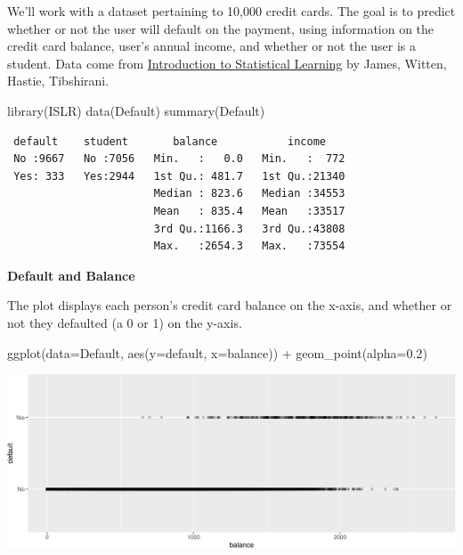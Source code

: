 \documentclass[
  letterpaper,
  DIV=11,
  numbers=noendperiod]{scrreprt}
\newenvironment{Shaded}{\begin{snugshade}}{\end{snugshade}}
\newcommand{\AttributeTok}[1]{\textcolor[rgb]{0.40,0.45,0.13}{#1}}
\newcommand{\FloatTok}[1]{\textcolor[rgb]{0.68,0.00,0.00}{#1}}
\newcommand{\FunctionTok}[1]{\textcolor[rgb]{0.28,0.35,0.67}{#1}}
\newcommand{\NormalTok}[1]{\textcolor[rgb]{0.00,0.23,0.31}{#1}}
\newcommand{\SpecialCharTok}[1]{\textcolor[rgb]{0.37,0.37,0.37}{#1}}
\begin{document}
We'll work with a dataset pertaining to 10,000 credit cards. The goal is
to predict whether or not the user will default on the payment, using
information on the credit card balance, user's annual income, and
whether or not the user is a student. Data come from
\href{http://www-bcf.usc.edu/~gareth/ISL/data.html}{Introduction to
Statistical Learning} by James, Witten, Hastie, Tibshirani.

\begin{Shaded}
\begin{Highlighting}[]
\FunctionTok{library}\NormalTok{(ISLR)}
\FunctionTok{data}\NormalTok{(Default)}
\FunctionTok{summary}\NormalTok{(Default)}
\end{Highlighting}
\end{Shaded}

\begin{verbatim}
 default    student       balance           income     
 No :9667   No :7056   Min.   :   0.0   Min.   :  772  
 Yes: 333   Yes:2944   1st Qu.: 481.7   1st Qu.:21340  
                       Median : 823.6   Median :34553  
                       Mean   : 835.4   Mean   :33517  
                       3rd Qu.:1166.3   3rd Qu.:43808  
                       Max.   :2654.3   Max.   :73554  
\end{verbatim}

\textbf{Default and Balance}

The plot displays each person's credit card balance on the x-axis, and
whether or not they defaulted (a 0 or 1) on the y-axis.

\begin{Shaded}
\begin{Highlighting}[]
\FunctionTok{ggplot}\NormalTok{(}\AttributeTok{data=}\NormalTok{Default, }\FunctionTok{aes}\NormalTok{(}\AttributeTok{y=}\NormalTok{default, }\AttributeTok{x=}\NormalTok{balance)) }\SpecialCharTok{+} \FunctionTok{geom\_point}\NormalTok{(}\AttributeTok{alpha=}\FloatTok{0.2}\NormalTok{) }
\end{Highlighting}
\end{Shaded}

\includegraphics{Ch6_files/figure-pdf/unnamed-chunk-4-1.pdf}
\end{document}
